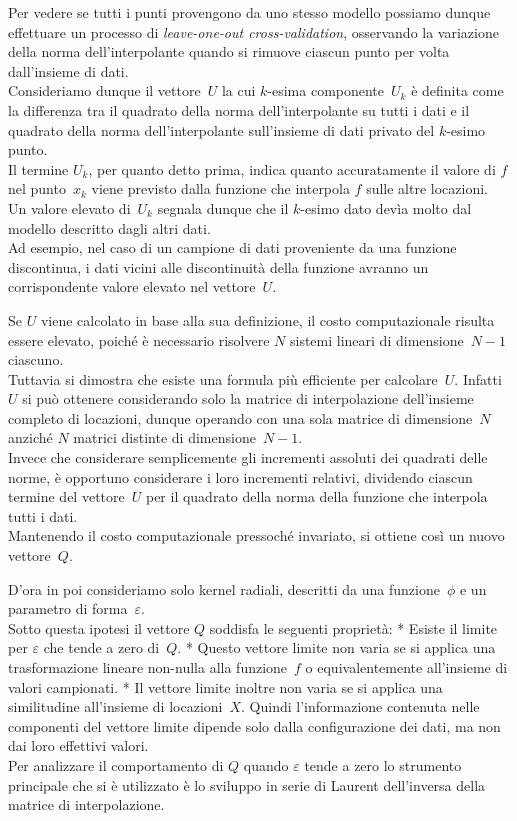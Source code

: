 \rf Per vedere se tutti i punti provengono da uno stesso modello possiamo dunque effettuare un processo di {\em leave-one-out cross-validation}, osservando la variazione della norma dell’interpolante quando si rimuove ciascun punto per volta dall’insieme di dati.\\
Consideriamo dunque il vettore~$U$ la cui $k$-esima componente~$U_k$ è definita come la differenza tra il quadrato della norma dell’interpolante su tutti i dati e il quadrato della norma dell’interpolante sull’insieme di dati privato del $k$-esimo punto.\\ 
Il termine $U_k$, per quanto detto prima, indica quanto accuratamente il valore di $f$ nel punto~$x_k$ viene previsto dalla funzione che interpola $f$ sulle altre locazioni.\\
Un valore elevato di~$U_k$ segnala dunque che il $k$-esimo dato devìa molto dal modello descritto dagli altri dati.\\
Ad esempio, nel caso di un campione di dati proveniente da una funzione discontinua, i dati vicini alle discontinuità della funzione avranno un corrispondente valore elevato nel vettore~$U$. 


\rf Se $U$ viene calcolato in base alla sua definizione, il costo computazionale risulta essere elevato, poiché è necessario risolvere $N$ sistemi lineari di dimensione~$N{-}1$ ciascuno.\\
Tuttavia si dimostra che esiste una formula più efficiente per calcolare~$U$.  Infatti $U$ si può ottenere considerando solo la matrice di interpolazione dell’insieme completo di locazioni, dunque operando con una sola matrice di dimensione~$N$ anziché $N$ matrici distinte di dimensione~$N{-}1$.\\ 
Invece che considerare semplicemente gli incrementi assoluti dei quadrati delle norme, è opportuno considerare i loro incrementi relativi, dividendo ciascun termine del vettore~$U$ per il quadrato della norma della funzione che interpola tutti i dati.\\
Mantenendo il costo computazionale pressoché invariato, si ottiene così un nuovo vettore~$Q$.


\rf D’ora in poi consideriamo solo kernel radiali, descritti da una funzione~$\phi$ e un parametro di forma~$\varepsilon$.\\
 Sotto questa ipotesi il  vettore $Q$  soddisfa le seguenti proprietà:
\begitems
* Esiste il limite per $\varepsilon$ che tende a zero di~$Q$.
* Questo vettore limite non varia se si applica una trasformazione lineare non-nulla alla funzione~$f$ o equivalentemente all’insieme di valori campionati.
* Il vettore limite inoltre non varia se si applica una similitudine all’insieme di locazioni~$X$.
\enditems
Quindi l’informazione contenuta nelle componenti del vettore limite dipende solo dalla configurazione dei dati, ma non dai loro effettivi valori.\\
Per analizzare il comportamento di $Q$ quando $\varepsilon$ tende a zero lo strumento principale che si è utilizzato è lo sviluppo in serie di Laurent dell’inversa della matrice di interpolazione.



